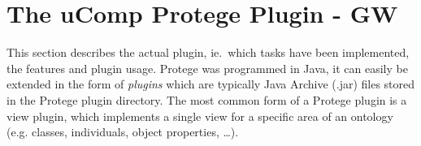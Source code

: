\section{The uComp Protege Plugin - GW}



This section describes the actual plugin, ie.~which tasks have been implemented, the features and plugin usage. 
Protege was programmed in Java, it can easily be extended in the form of \emph{plugins} which are typically Java Archive (.jar) files
stored in the Protege plugin directory. The most common form of a Protege plugin is a view plugin, which implements a single view for a specific area of an ontology (e.g. classes, individuals, object properties, \dots).

